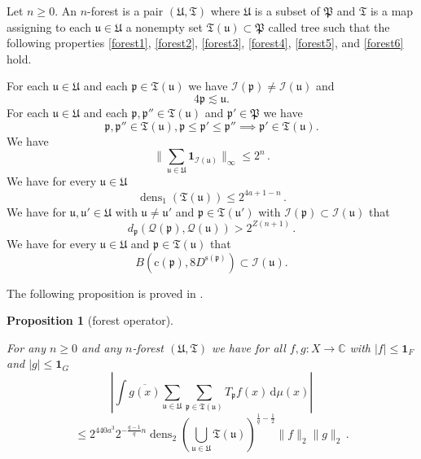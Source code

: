 \documentclass[10pt,a4paper]{article}
\theoremstyle{plain}
\newtheorem{proposition}[theorem]{Proposition}
\theoremstyle{definition}
\numberwithin{equation}{subsection}
\DeclareMathOperator{\dens}{\operatorname{dens}}
\newcommand{\fp}{{\mathfrak p}}
\newcommand{\fP}{{\mathfrak P}}
\newcommand{\fu}{{\mathfrak u}}
\newcommand{\fU}{{\mathfrak U}}
\newcommand{\fT}{{\mathfrak T}}
\newcommand{\pc}{{\mathrm{c}}}
\newcommand{\ps}{{\mathrm{s}}}
\newcommand{\scI}{{\mathcal{I}}} %
\newcommand{\fcc}{{\mathcal{Q}}}
\newcommand{\lean}[1]{}
\newcommand{\uses}[1]{}
\newcommand{\leanok}{}
\begin{document}
Let $n\ge 0$.
An $n$-forest is a pair $(\fU, \mathfrak{T})$
where $\fU$ is a subset of $\fP$
and $\mathfrak{T}$ is a map assigning to
each $\fu\in \fU$ a nonempty set $\fT (\fu)\subset \fP$ called tree
such that the following properties
\eqref{forest1}, \eqref{forest2},
\eqref{forest3},
\eqref{forest4},
\eqref{forest5}, and
\eqref{forest6}
hold.

For each $\fu\in \fU$ and each $\fp\in \fT(\fu)$
we have $\scI(\fp) \ne \scI(\fu)$ and
\begin{equation}\label{forest1}
    4\fp\lesssim \fu.
\end{equation}
For each $\fu \in \fU$ and each $\fp,\fp''\in \fT(\fu)$ and $\fp'\in \fP$
we have
\begin{equation}\label{forest2}
    \fp, \fp'' \in \mathfrak{T}(\fu), \fp \leq \fp' \leq \fp'' \implies \fp' \in \mathfrak{T}(\fu).
\end{equation}
We have
\begin{equation}\label{forest3}
   \|\sum_{\fu\in \fU} \mathbf{1}_{\scI(\fu)}\|_\infty \leq 2^n\,.
\end{equation}
We have for every $\fu\in \fU$
\begin{equation}\label{forest4}
    \dens_1(\fT(\fu))\le 2^{4a + 1-n}\, .
\end{equation}
We have for $\fu, \fu'\in \fU$ with $\fu\neq \fu'$ and $\fp\in \fT(\fu')$ with $\scI(\fp)\subset \scI(\fu)$ that
\begin{equation}\label{forest5}
    d_{\fp}(\fcc(\fp), \fcc(\fu))>2^{Z(n+1)}\, .
\end{equation}
We have for every $\fu\in \fU$ and $\fp\in \fT(\fu)$ that
\begin{equation}\label{forest6}
    B(\pc(\fp), 8D^{\ps(\fp)})\subset \scI(\fu).
\end{equation}


The following proposition is proved in .
\begin{proposition}[forest operator]
\label{forest-operator}
\leanok
\lean{forest_operator}
\uses{forest-row-decomposition,row-bound,row-correlation,disjoint-row-support}
For any $n\ge 0$ and any $n$-forest $(\fU,\fT)$ we have for all $f,g: X \to \mathbb{C}$ with $|f| \le \mathbf{1}_F$ and $|g| \le \mathbf{1}_G$
$$
    | \int \overline{g(x)} \sum_{\fu\in \fU} \sum_{\fp\in \fT(\fu)} T_{\fp} f(x) \, \mathrm{d}\mu(x)|
$$
$$
    \le
    2^{440a^3}2^{-\frac{q-1}{q} n} \dens_2\left(\bigcup_{\fu\in \fU}\fT(\fu)\right)^{\frac{1}{q}-\frac{1}{2}} \|f\|_2 \|g\|_2 \,.
$$
\end{proposition}
\end{document}
